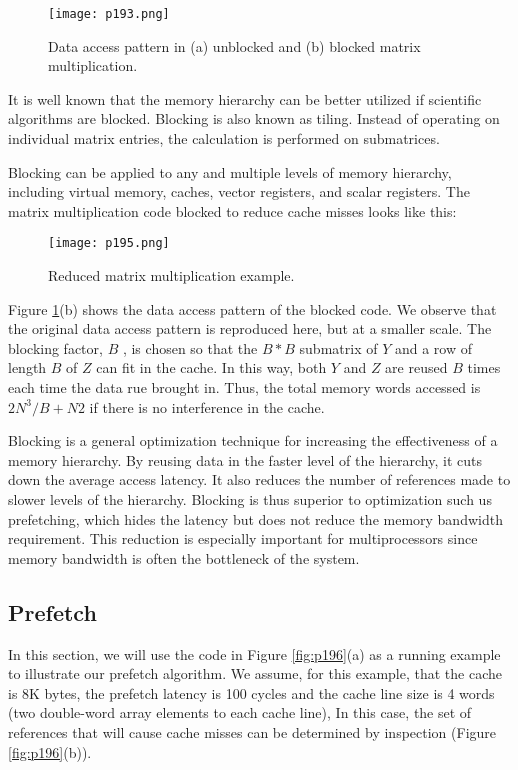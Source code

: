 \begin{figure}[H]
	\centering
	\texttt{[image: p193.png]}
	\caption{Data access pattern in (a) unblocked and (b) blocked matrix multiplication.}
	\label{fig:p193}
\end{figure}


It is well known that the memory hierarchy can be better 
utilized if scientific algorithms are blocked.
Blocking is also known as tiling. 
Instead of operating on individual matrix entries, 
the calculation is performed on submatrices.


Blocking can be applied to any and multiple levels of memory
hierarchy, including virtual memory, caches, vector registers, and
scalar registers. The matrix multiplication code
blocked to reduce cache misses looks like this:

\begin{figure}[H]
	\centering
	\texttt{[image: p195.png]}
	\caption{Reduced matrix multiplication example.}
	\label{fig:p195}
\end{figure}


Figure \ref{fig:p193}(b) shows the data access pattern of the 
blocked code. We
observe that the original data access pattern is reproduced here,
but at a smaller scale. The blocking factor, $B$ , is chosen so that
the $B * B$ submatrix of $Y$ and a row of length $B$ of $Z$ can fit in
the cache. In this way, both $Y$ and $Z$ are reused $B$ times each time
the data rue brought in. Thus, the total memory words accessed
is $2N^3/B + N2$ if there is no interference in the cache.

Blocking is a general optimization technique for increasing the
effectiveness of a memory hierarchy. By reusing data in the faster
level of the hierarchy, it cuts down the average access latency.
It also reduces the number of references made to slower levels
of the hierarchy. Blocking is thus superior to optimization such
us prefetching, which hides the latency but does not reduce the
memory bandwidth requirement. This reduction is especially important for multiprocessors since memory bandwidth is often the
bottleneck of the system.

\subsection{Prefetch\cite{mowry1992design}}
In this section, we will use the code in Figure \ref{fig:p196}(a) as a running
example to illustrate our prefetch algorithm. We assume, for this
example, that the cache is 8K bytes, the prefetch latency is 100
cycles and the cache line size is 4 words (two double-word array 
elements to each cache line), In this case, the set of references 
that will
cause cache misses can be determined by inspection (Figure \ref{fig:p196}(b)).


